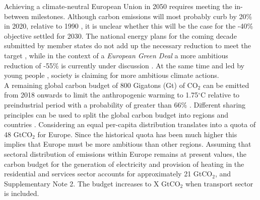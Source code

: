 \documentclass[5p]{elsarticle} %
\begin{document}
\linenumbers


Achieving a climate-neutral European Union in 2050 \cite{in-depth_2018} requires meeting the in-between milestones. Although carbon emissions will most probably curb by 20\% in 2020, relative to 1990 \cite{EEA_totalGHG}, it is unclear whether this will be the case for the -40\% objective settled for 2030. The national energy plans for the coming decade submitted by member states do not add up the necessary reduction to meet the target \cite{EU-appraisal_2019}, while in the context of a \textit{European Green Deal} a more ambitious reduction of -55\% is currently under discussion \cite{GreenDeal}. At the same time and led by young people \cite{Warren_2019}, society is claiming for more ambitious climate actions. \\ %

A remaining global carbon budget of 800 Gigatons (Gt) of CO$_2$ can be emitted from 2018 onwards to limit the anthropogenic warming to 1.75$^{\circ}$C relative to preindustrial period with a probability of greater than 66\% \cite{IPCC_1.5}. Different sharing principles can be used to split the global carbon budget into regions and countries \cite{Raupach_2014}. Considering an equal per-capita distribution translates into a quota of 48 GtCO$_2$ for Europe. Since the historical quota has been much higher this implies that Europe must be more ambitious than other regions. Assuming that sectoral distribution of emissions within Europe remains at present values, the carbon budget for the generation of electricity and provision of heating in the residential and services sector accounts for approximately 21 GtCO$_2$, \cite{UNFCCC_inventory} and Supplementary Note 2. The budget increases to \textcolor[rgb]{1,0,0}{X GtCO$_2$ when transport sector is included}. \\ %
\end{document}
